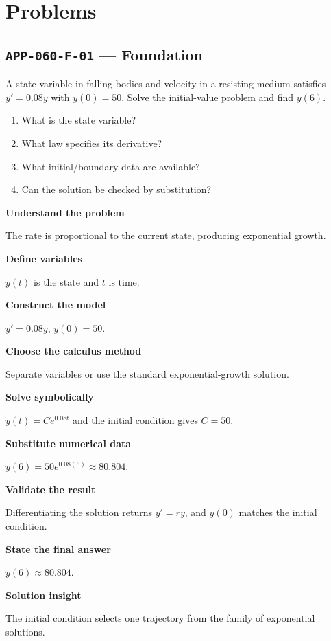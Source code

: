 \documentclass[11pt]{book}
\newcommand{\pid}[1]{\texttt{#1}}
\begin{document}
\section*{Problems}
\subsection*{\pid{APP-060-F-01} — Foundation}
\begin{problembox}
A state variable in falling bodies and velocity in a resisting medium satisfies $y'=0.08y$ with $y(0)=50$. Solve the initial-value problem and find $y(6)$.
\end{problembox}
\begin{promptbox}\begin{enumerate}
\item What is the state variable?
\item What law specifies its derivative?
\item What initial/boundary data are available?
\item Can the solution be checked by substitution?
\end{enumerate}\end{promptbox}
\begin{solutionbox}
\textbf{Understand the problem}\par The rate is proportional to the current state, producing exponential growth.\par\medskip
\textbf{Define variables}\par $y(t)$ is the state and $t$ is time.\par\medskip
\textbf{Construct the model}\par $y'=0.08y$, $y(0)=50$.\par\medskip
\textbf{Choose the calculus method}\par Separate variables or use the standard exponential-growth solution.\par\medskip
\textbf{Solve symbolically}\par $y(t)=Ce^{0.08t}$ and the initial condition gives $C=50$.\par\medskip
\textbf{Substitute numerical data}\par $y(6)=50e^{0.08(6)}\approx 80.804$.\par\medskip
\textbf{Validate the result}\par Differentiating the solution returns $y'=ry$, and $y(0)$ matches the initial condition.\par\medskip
\textbf{State the final answer}\par $y(6)\approx 80.804$.\par\medskip
\textbf{Solution insight}\par The initial condition selects one trajectory from the family of exponential solutions.\par\medskip
\end{solutionbox}
\end{document}
